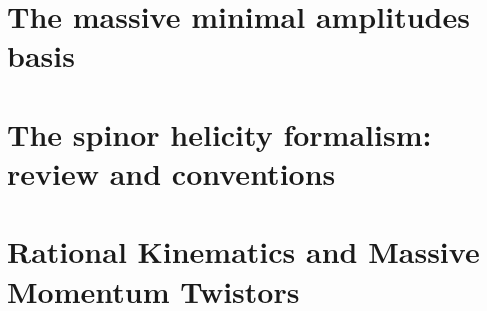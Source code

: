\documentclass[aps,prd,nofootinbib,twocolumn,10pt]{revtex4-2}
\begin{document}
\section{The massive minimal amplitudes basis}

    
\appendix

\section{The spinor helicity formalism: review and conventions}
\label{sec:spinorhelicity}

\section{Rational Kinematics and Massive Momentum Twistors}
    \label{sec:massivetwistors}

% 
% 
\end{document}
